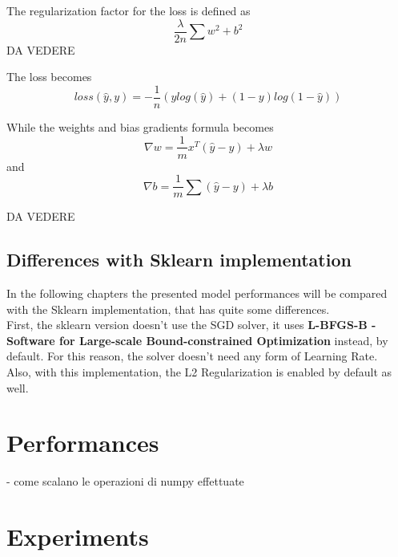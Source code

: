 \documentclass[
	letterpaper, %
	10pt, %
]{class}
\begin{document}
The regularization factor for the loss is defined as
$$ \frac{\lambda}{2n}\sum w^2 + b^2 $$ DA VEDERE

The loss becomes
$$ loss(\hat{y}, y) = -\frac{1}{n}(y log(\hat{y}) + (1-y)log(1-\hat{y}))$$

While the weights and bias gradients formula becomes
$$ \nabla w = \frac{1}{m}x^T(\hat{y} - y) + \lambda w $$
and
$$ \nabla b = \frac{1}{m}\sum(\hat{y} - y) + \lambda b$$

DA VEDERE

\subsection{Differences with Sklearn implementation}

In the following chapters the presented model performances will be compared with the Sklearn implementation, that has quite some differences.\\
First, the sklearn version doesn't use the SGD solver, it uses \textbf{L-BFGS-B - Software for Large-scale Bound-constrained Optimization} instead, by default.
For this reason, the solver doesn't need any form of Learning Rate.\\
Also, with this implementation, the L2 Regularization is enabled by default as well.



\section{Performances}

- come scalano le operazioni di numpy effettuate


\section{Experiments}
\end{document}
